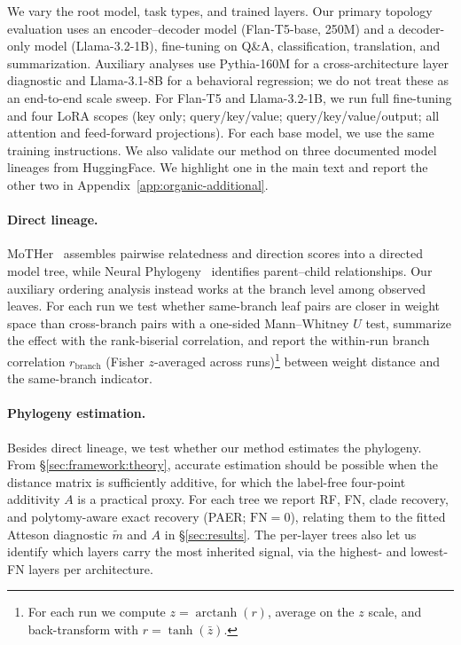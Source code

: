 \documentclass{article}
\theoremstyle{definition}
\theoremstyle{plain}
\begin{document}
We vary the root model, task types, and trained layers. Our primary topology evaluation uses an
encoder--decoder model (Flan-T5-base, 250M) and a decoder-only model (Llama-3.2-1B), fine-tuning on
Q\&A, classification, translation, and summarization. Auxiliary analyses use Pythia-160M for a
cross-architecture layer diagnostic and Llama-3.1-8B for a behavioral regression; we do not treat
these as an end-to-end scale sweep. For Flan-T5 and Llama-3.2-1B, we run
full fine-tuning and four LoRA \citep{hu2022lora} scopes (key only; query/key/value;
query/key/value/output; all attention and feed-forward projections). For each base model, we use the same training instructions. We also
validate our method on three documented model lineages from HuggingFace. We highlight one in the
main text and report the other two in Appendix~\ref{app:organic-additional}.

\paragraph{Direct lineage.}
MoTHer~\citep{horwitz2025mother} assembles pairwise relatedness and direction scores into a directed
model tree, while Neural Phylogeny~\citep{yu2025neural} identifies parent--child relationships. Our
auxiliary ordering analysis instead works at the branch level among observed leaves. For each run we test whether same-branch leaf pairs are closer in weight space than cross-branch pairs with a one-sided Mann--Whitney $U$ test, summarize the effect with the rank-biserial correlation, and report the within-run branch correlation $r_{\mathrm{branch}}$ (Fisher $z$-averaged across runs)\footnote{For each run we compute $z=\operatorname{arctanh}(r)$, average on the $z$ scale, and back-transform with $r=\tanh(\bar z)$.} between weight distance and the same-branch indicator.

\paragraph{Phylogeny estimation.}
\label{sec:exp:weights}
Besides direct lineage, we test whether our method estimates the phylogeny. From \S\ref{sec:framework:theory}, accurate estimation should be possible when the distance matrix is sufficiently additive, for which the label-free four-point additivity $A$ is a practical proxy. For each tree we report RF, FN, clade recovery, and polytomy-aware exact recovery (PAER; $\mathrm{FN}=0$), relating them to the fitted Atteson diagnostic $\widetilde m$ and $A$ in \S\ref{sec:results}. The per-layer trees also let us identify which layers carry the most inherited signal, via the highest- and lowest-FN layers per architecture.
\end{document}
